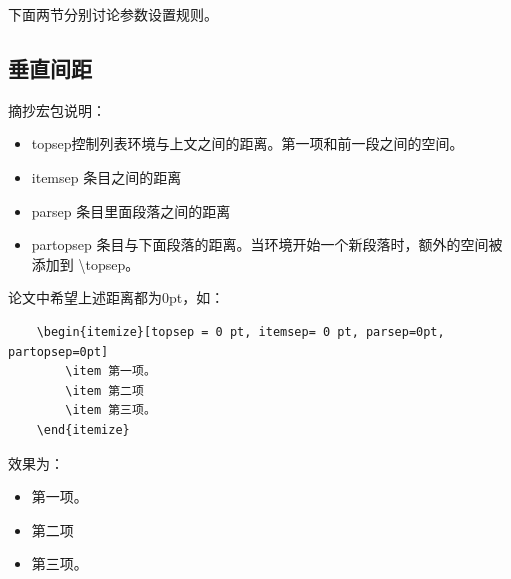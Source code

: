 下面两节分别讨论参数设置规则。
\subsection{垂直间距}
摘抄宏包说明：
\begin{itemize}[topsep = 0 pt, itemsep= 0 pt, parsep=0pt, partopsep=0pt, leftmargin=36pt, itemindent=0pt, labelsep=6pt, listparindent=24pt]
	\item topsep控制列表环境与上文之间的距离。第一项和前一段之间的空间。

	\item itemsep 条目之间的距离

	\item parsep 条目里面段落之间的距离
 
	\item partopsep 条目与下面段落的距离。当环境开始一个新段落时，额外的空间被添加到 \textbackslash{}topsep。
\end{itemize}

论文中希望上述距离都为0pt，如：
\begin{lstlisting}
	\begin{itemize}[topsep = 0 pt, itemsep= 0 pt, parsep=0pt, partopsep=0pt]
		\item 第一项。
		\item 第二项
		\item 第三项。
	\end{itemize}
\end{lstlisting}
效果为：
\begin{itemize}[topsep = 0 pt, itemsep= 0 pt, parsep=0pt, partopsep=0pt]
	\item 第一项。
	\item 第二项
	\item 第三项。
\end{itemize}


